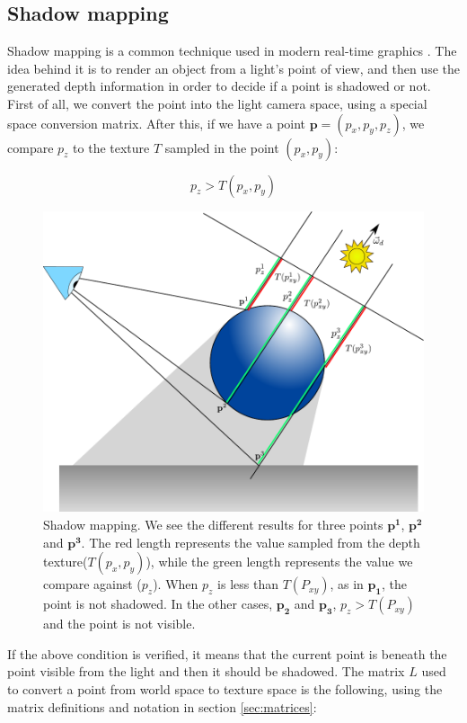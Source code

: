 \subsection{Shadow mapping}
Shadow mapping is a common technique used in modern real-time graphics \citep{everitt,Segal:1992:FSL:142920.134071,williams1978a}. The idea behind it is to render an object from a light's point of view, and then use the generated depth information in order to decide if a point is shadowed or not. First of all, we convert the point into the light camera space, using a special space conversion matrix. After this, if we have a point $\mathbf{p} = (p_x,p_y,p_z)$, we compare $p_z$ to the texture $T$ sampled in the point $(p_x,p_y)$:

$$
p_z > T(p_x,p_y)
$$ 

\begin{figure}[!ht]
\centering
\includegraphics[width=\linewidth]{images/method/shadow_map.pdf}
\caption{Shadow mapping. We see the different results for three points $\mathbf{p^1}$, $\mathbf{p^2}$ and $\mathbf{p^3}$. The red length represents the value sampled from the depth texture($T(p_x,p_y)$), while the green length represents the value we compare against ($p_z$). When $p_z$ is less than $T(P_{xy})$, as in $\mathbf{p_1}$, the point is not shadowed. In the other cases, $\mathbf{p_2}$ and $\mathbf{p_3}$, $p_z > T(P_{xy})$and the point is not visible.}
\label{fig:step3}
\end{figure} 

If the above condition is verified, it means that the current point is beneath the point visible from the light and then it should be shadowed. The matrix $L$ used to convert a point from world space to texture space is the following, using the matrix definitions and notation in section \ref{sec:matrices}:

